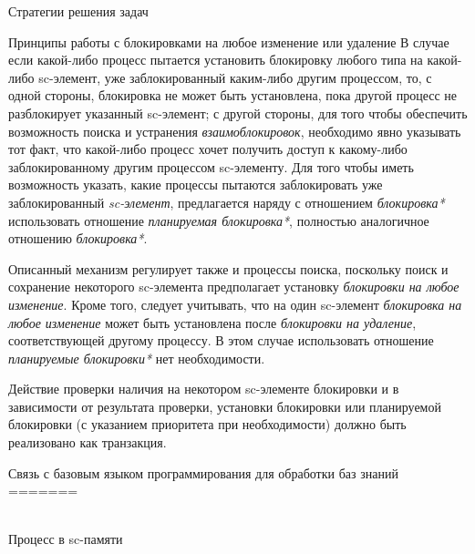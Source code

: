 \begin{frame}{Стратегии решения задач}
\begin{frame}{\large Принципы работы с блокировками на любое изменение или удаление}
В случае если какой-либо процесс пытается установить блокировку любого типа на какой-либо sc-элемент, уже заблокированный каким-либо другим процессом, то, с одной стороны, блокировка не может быть установлена, пока другой процесс не разблокирует указанный sc-элемент; с другой стороны, для того чтобы обеспечить возможность поиска и устранения \textit{взаимоблокировок}, необходимо явно указывать тот факт, что какой-либо процесс хочет получить доступ к какому-либо заблокированному другим процессом sc-элементу. Для того чтобы иметь возможность указать, какие процессы пытаются заблокировать уже заблокированный \textit{sc-элемент}, предлагается наряду с отношением \textit{блокировка*} использовать отношение \textit{планируемая блокировка*}, полностью аналогичное отношению \textit{блокировка*}.
	
Описанный механизм регулирует также и процессы поиска, поскольку поиск и сохранение некоторого sc-элемента предполагает установку \textit{блокировки на любое изменение}. Кроме того, следует учитывать, что на один sc-элемент \textit{блокировка на любое изменение} может быть установлена после \textit{блокировки на удаление}, соответствующей другому процессу. В этом случае использовать отношение \textit{планируемые блокировки*} нет необходимости.
	
Действие проверки наличия на некотором sc-элементе блокировки и в зависимости от результата проверки, установки блокировки или планируемой блокировки (с указанием приоритета при необходимости) должно быть реализовано как транзакция.

\begin{frame}{Связь с базовым языком программирования для обработки баз
знаний}
\vspace{15}
=======
\begin{frame}{\\Процесс в sc-памяти}
\topline
\vspace{30}
 \\
\begin{SCn}
\begin{scnindent}
\begin{scneqtoset}
\end{scneqtoset}
\end{scnindent}
\end{SCn}
\end{frame}


\end{frame}
\end{frame}
\end{frame}
